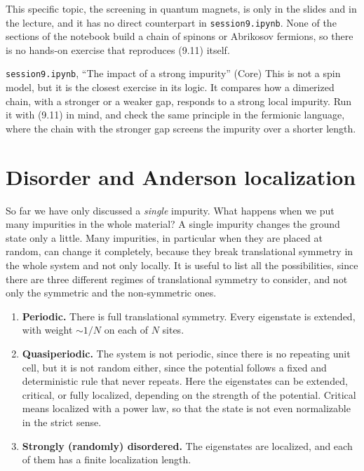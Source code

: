 

This specific topic, the screening in quantum magnets, is only in the slides and in the lecture, and
it has no direct counterpart in \texttt{session9.ipynb}. None of the sections of the notebook build a
chain of spinons or Abrikosov fermions, so there is no hands-on exercise that reproduces (9.11)
itself.

\begin{notebookbox}{\texttt{session9.ipynb}, ``The impact of a strong impurity'' (Core)}
This is not a spin model, but it is the closest exercise in its logic. It compares how a dimerized
chain, with a stronger or a weaker gap, responds to a strong local impurity. Run it with (9.11) in
mind, and check the same principle in the fermionic language, where the chain with the stronger gap
screens the impurity over a shorter length.
\end{notebookbox}

\section{Disorder and Anderson localization}

So far we have only discussed a \emph{single} impurity. What happens when we put many impurities in
the whole material? A single impurity changes the ground state only a little. Many impurities, in
particular when they are placed at random, can change it completely, because they break translational
symmetry in the whole system and not only locally. It is useful to list all the possibilities, since
there are three different regimes of translational symmetry to consider, and not only the symmetric
and the non-symmetric ones.

\begin{enumerate}
\item \textbf{Periodic.} There is full translational symmetry. Every eigenstate is extended, with
   weight $\sim 1/N$ on each of $N$ sites.
\item \textbf{Quasiperiodic.} The system is not periodic, since there is no repeating unit cell, but it
   is not random either, since the potential follows a fixed and deterministic rule that never
   repeats. Here the eigenstates can be extended, critical, or fully localized, depending on the
   strength of the potential. Critical means localized with a power law, so that the state is not even
   normalizable in the strict sense.
\item \textbf{Strongly (randomly) disordered.} The eigenstates are localized, and each of them has a
   finite localization length.
\end{enumerate}

